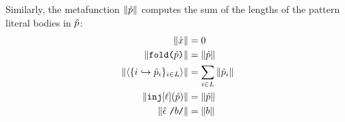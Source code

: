 
Similarly, the metafunction $\Vert \hat{p} \Vert$ computes the sum of the lengths of the pattern literal bodies in $\hat{p}$:
\begin{align*}
\Vert {\hat x} \Vert & = 0\\
\Vert \texttt{fold}\texttt{(}\hat{p}\texttt{)} \Vert & = \Vert \hat{p} \Vert\\
\Vert \langle \{i \hookrightarrow \hat{p}_{i}\}_{i \in L} \rangle \Vert & = \sum_{i \in L} \Vert \hat{p}_i \Vert\\
\Vert \texttt{inj}[\ell](\hat{p}) \Vert & = \Vert \hat{p} \Vert\\
\Vert {\hat\epsilon}~\texttt{/}b\texttt{/} \Vert & = \Vert b \Vert
\end{align*}

